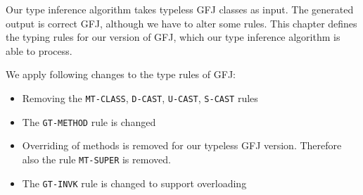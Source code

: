 Our type inference algorithm takes typeless GFJ classes as input.
The generated output is correct GFJ, although we have to alter some rules.
This chapter defines the typing rules for our version of GFJ,
which our type inference algorithm is able to process.

We apply following changes to the type rules of GFJ:
\begin{itemize}
\item Removing the \texttt{MT-CLASS}, \texttt{D-CAST}, \texttt{U-CAST}, \texttt{S-CAST} rules
\item The \texttt{GT-METHOD} rule is changed
\item Overriding of methods is removed for our typeless GFJ version. Therefore also the rule \texttt{MT-SUPER} is removed.
\item The \texttt{GT-INVK} rule is changed to support overloading
\end{itemize}


